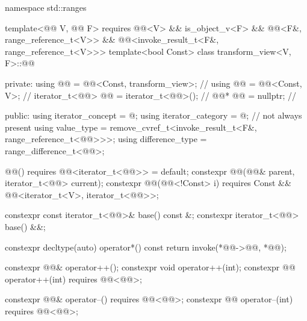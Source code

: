 %
\begin{codeblock}
namespace std::ranges {
  template<@@ V, @@ F>
    requires @@<V> && is_object_v<F> &&
             @@<F&, range_reference_t<V>> &&
             @@<invoke_result_t<F&, range_reference_t<V>>>
  template<bool Const>
  class transform_view<V, F>::@@ {
  private:
    using @@ = @@<Const, transform_view>;          // \expos
    using @@ = @@<Const, V>;                         // \expos
    iterator_t<@@> @@ = iterator_t<@@>();             // \expos
    @@* @@ = nullptr;                                  // \expos

  public:
    using iterator_concept  = @\seebelownc@;
    using iterator_category = @\seebelownc@;                        // not always present
    using value_type        =
      remove_cvref_t<invoke_result_t<F&, range_reference_t<@@>>>;
    using difference_type   = range_difference_t<@@>;

    @@() requires @@<iterator_t<@@>> = default;
    constexpr @@(@@& parent, iterator_t<@@> current);
    constexpr @@(@@<!Const> i)
      requires Const && @@<iterator_t<V>, iterator_t<@@>>;

    constexpr const iterator_t<@@>& base() const &;
    constexpr iterator_t<@@> base() &&;

    constexpr decltype(auto) operator*() const {
      return invoke(*@@->@@, *@@);
    }

    constexpr @@& operator++();
    constexpr void operator++(int);
    constexpr @@ operator++(int) requires @@<@@>;

    constexpr @@& operator--() requires @@<@@>;
    constexpr @@ operator--(int) requires @@<@@>;

}}
\end{codeblock}
